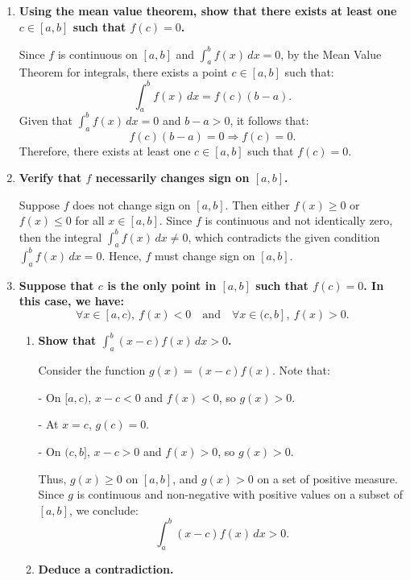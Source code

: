 \documentclass[12pt]{article}
\begin{document}
\begin{answerbox}
\begin{enumerate}
  \item \textbf{Using the mean value theorem, show that there exists at least one $ c \in [a, b] $ such that $ f(c) = 0 $.}
  
  Since $ f $ is continuous on $[a, b]$ and $\int_a^b f(x)\,dx = 0$, by the Mean Value Theorem for integrals, there exists a point $ c \in [a, b] $ such that:
  $$
  \int_a^b f(x)\,dx = f(c)(b - a).
  $$
  Given that $ \int_a^b f(x)\,dx = 0 $ and $ b - a > 0 $, it follows that:
  $$
  f(c)(b - a) = 0 \Rightarrow f(c) = 0.
  $$
  Therefore, there exists at least one $ c \in [a, b] $ such that $ f(c) = 0 $.

  \item \textbf{Verify that $ f $ necessarily changes sign on $[a, b]$.}

  Suppose $ f $ does not change sign on $[a, b]$. Then either $ f(x) \geq 0 $ or $ f(x) \leq 0 $ for all $ x \in [a, b] $. Since $ f $ is continuous and not identically zero, then the integral $ \int_a^b f(x)\,dx \neq 0 $, which contradicts the given condition $ \int_a^b f(x)\,dx = 0 $. Hence, $ f $ must change sign on $[a, b]$.

  \item \textbf{Suppose that $ c $ is the only point in $[a, b]$ such that $ f(c) = 0 $. In this case, we have:}
  $$
  \forall x \in [a, c),\ f(x) < 0 \quad \text{and} \quad \forall x \in (c, b],\ f(x) > 0.
  $$

  \begin{enumerate}
      \item \textbf{Show that $ \int_a^b (x - c)f(x)\,dx > 0 $.}

      Consider the function $ g(x) = (x - c)f(x) $. Note that:
      
          
- On $ [a, c) $, $ x - c < 0 $ and $ f(x) < 0 $, so $ g(x) > 0 $.
          
- At $ x = c $, $ g(c) = 0 $.
          
- On $ (c, b] $, $ x - c > 0 $ and $ f(x) > 0 $, so $ g(x) > 0 $.
      
      Thus, $ g(x) \geq 0 $ on $[a, b]$, and $ g(x) > 0 $ on a set of positive measure. Since $ g $ is continuous and non-negative with positive values on a subset of $[a, b]$, we conclude:
      $$
      \int_a^b (x - c)f(x)\,dx > 0.
      $$

      \item \textbf{Deduce a contradiction.}


\end{enumerate}
\end{enumerate}
\end{answerbox}
\end{document}
